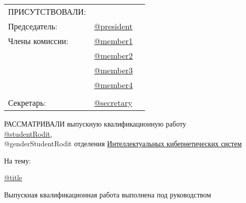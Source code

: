 \documentclass[a4paper,12pt]{article} %
\begin{document}
\begin{center} 		
	\begin{tabular}{lll}
		\vspace{0.2cm}
		ПРИСУТСТВОВАЛИ:\\
		\vspace{0.4cm}
		Председатель:  \hspace{2cm} 	& \underline{@president}  \\
		Члены комиссии:\hspace{2cm} 	& \underline{@member1}  \\
					   \hspace{2cm}  	& \underline{@member2}  \\
					   \hspace{2cm}		& \underline{@member3}  \\
					   \hspace{2cm}		& \underline{@member4}  \\ 
	   \vspace{-0.25cm}
		 	\\			
		Секретарь:     \hspace{2cm}		& \underline{@secretary}  \\	    
	\end{tabular}
\end{center}
	\vspace{0.2cm}
	
	\hspace{1cm}РАССМАТРИВАЛИ выпускную квалификационную работу \\
	
	\vspace{-0.5cm}
	\hspace{1cm}\underline{@studentRodit,}\\
	
	\vspace{-0.4cm}
	\hspace{1cm}@genderStudentRodit отделения \underline{Интеллектуальных кибернетических систем}

    \vspace{0.2cm}
	\hspace{1cm}На тему: 
	\vspace{0.15cm}

	\hspace{0.9cm}
	\begin{minipage}{6,3in}
	\uline{@title }
	\end{minipage} 
		
		
	
    \vspace{0.2cm}
	\hspace{1cm}Выпускная квалификационная работа выполнена под руководством
	
\end{document}
